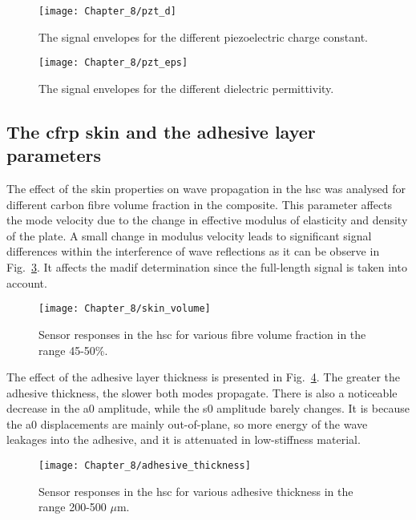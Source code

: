 \begin{figure}
	\begin{center}
		\texttt{[image: Chapter\_8/pzt\_d]}
	\end{center}
	\caption{The signal envelopes for the different piezoelectric charge constant.}
	\label{fig:pzt_d}
\end{figure}

\begin{figure}
	\begin{center}
		\texttt{[image: Chapter\_8/pzt\_eps]}
	\end{center}
	\caption{The signal envelopes for the different dielectric permittivity.}
	\label{fig:pzt_eps}
\end{figure}

\subsection{The \ac{cfrp} skin and the adhesive layer parameters}

The effect of the skin properties on wave propagation in the \ac{hsc} was analysed for different carbon fibre volume fraction in the composite.
This parameter affects the mode velocity due to the change in effective modulus of elasticity and density of the plate.
A small change in modulus velocity leads to significant signal differences within the interference of wave reflections as it can be observe in Fig.~\ref{fig:skin_volume}.
It affects the \ac{madif} determination since the full-length signal is taken into account.

\begin{figure}
	\begin{center}
		\texttt{[image: Chapter\_8/skin\_volume]}
	\end{center}
		\caption{Sensor responses in the \acf{hsc} for various fibre volume fraction in the range 45-50\%.}
	\label{fig:skin_volume}
\end{figure}

The effect of the adhesive layer thickness is presented in Fig.~\ref{fig:adhesive_thickness}.
The greater the adhesive thickness, the slower both modes propagate.
There is also a noticeable decrease in the \ac{a0} amplitude, while the \ac{s0} amplitude barely changes.
It is because the \ac{a0} displacements are mainly out-of-plane, so more energy of the wave leakages into the adhesive, and it is attenuated in low-stiffness material.

\begin{figure}
	\begin{center}
		\texttt{[image: Chapter\_8/adhesive\_thickness]}
	\end{center}
	\caption{Sensor responses in the \acf{hsc} for various adhesive thickness in the range 200-500 \(\mu\)m.}
	\label{fig:adhesive_thickness}
\end{figure}

